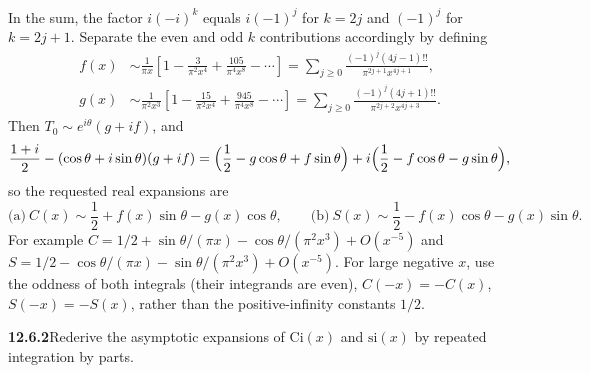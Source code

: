 In the sum, the factor $i(-i)^k$ equals $i(-1)^j$ for $k=2j$ and
$(-1)^j$ for $k=2j+1$. Separate the even and odd $k$ contributions
accordingly by defining
\begin{align*}
f(x)&\sim\frac1{\pi x}\left[1-\frac3{\pi^2x^4}
 +\frac{105}{\pi^4x^8}-\cdots\right]
 =\sum_{j\ge0}\frac{(-1)^j(4j-1)!!}{\pi^{2j+1}x^{4j+1}},\\
g(x)&\sim\frac1{\pi^2x^3}\left[1-\frac{15}{\pi^2x^4}
 +\frac{945}{\pi^4x^8}-\cdots\right]
 =\sum_{j\ge0}\frac{(-1)^j(4j+1)!!}{\pi^{2j+2}x^{4j+3}}.
\end{align*}
Then $T_0\sim e^{i\theta}(g+if)$, and
\[
\frac{1+i}2-(\cos\theta+i\sin\theta)(g+if)
=\Bigl(\frac12-g\cos\theta+f\sin\theta\Bigr)
+i\Bigl(\frac12-f\cos\theta-g\sin\theta\Bigr),
\]
so the requested real expansions are
\[
\text{(a)}\ \boxed{C(x)\sim\frac12+f(x)\sin\theta-g(x)\cos\theta},
\qquad
\text{(b)}\ \boxed{S(x)\sim\frac12-f(x)\cos\theta-g(x)\sin\theta}.
\]
For example $C=1/2+\sin\theta/(\pi x)-\cos\theta/(\pi^2x^3)
+O(x^{-5})$ and $S=1/2-\cos\theta/(\pi x)-\sin\theta/(\pi^2x^3)
+O(x^{-5})$. For large negative $x$, use the oddness of both integrals
(their integrands are even), $C(-x)=-C(x)$, $S(-x)=-S(x)$, rather than
the positive-infinity constants $1/2$.

\par\bigskip
\noindent\textbf{12.6.2}\quad Rederive the asymptotic expansions of
$\mathrm{Ci}(x)$ and $\mathrm{si}(x)$  by repeated integration by parts.

